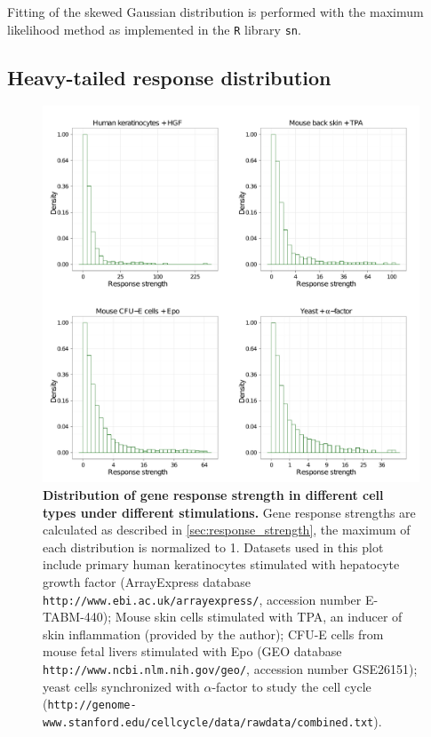 Fitting of the skewed Gaussian distribution is performed with
the maximum likelihood method as implemented in the 
\texttt{R}
library \texttt{sn}.

\subsection{Heavy-tailed response distribution}

\begin{figure}[!ht]
\begin{center}
\includegraphics[width=\textwidth]{network/fig/response_all.pdf}
\end{center}
\caption[Heavy-tail distribution of gene response strength]{
{\bf Distribution of gene response strength in different
cell types under different stimulations.}
Gene response strengths are calculated as described in 
\ref{sec:response_strength}, the maximum of each distribution
is normalized to 1. Datasets used in this plot include 
primary human keratinocytes 
stimulated with hepatocyte growth factor (ArrayExpress database 
\texttt{http://www.ebi.ac.uk/arrayexpress/},
accession number E-TABM-440); Mouse skin cells stimulated with TPA,
an inducer of skin inflammation (provided by the author); 
CFU-E cells from mouse fetal livers stimulated
with Epo (GEO database \texttt{http://www.ncbi.nlm.nih.gov/geo/}, accession
number GSE26151); yeast cells synchronized with 
$\alpha$-factor to study the cell cycle
\\(\texttt{http://genome-www.stanford.edu/cellcycle/data/rawdata/combined.txt}).
}
\label{fig:response_strength}
\end{figure}

